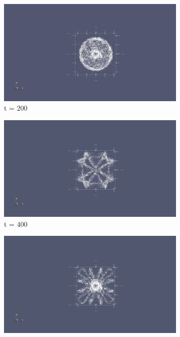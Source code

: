 \begin{figure}
	\centering
    \begin{subfigure}{.49\textwidth}
    	\centering
    	\includegraphics[width=.95\linewidth]{Figures/FDTD2DE1}
    	\caption{t = 200}
    \end{subfigure}
    \begin{subfigure}{.49\textwidth}
    	\centering
    	\includegraphics[width=.95\linewidth]{Figures/FDTD2DE2}
    	\caption{t = 400}
    \end{subfigure}
    \begin{subfigure}{.49\textwidth}
    	\centering
    	\includegraphics[width=.95\linewidth]{Figures/FDTD2DE3}

\end{subfigure}
\end{figure}
